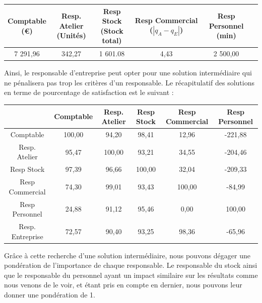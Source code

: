 \documentclass[paper=a4, fontsize=11pt]{report}
\numberwithin{equation}{section}		%
\numberwithin{figure}{section}			%
\numberwithin{table}{section}				%
\newcommand\abs[1]{\left|#1\right|}
\begin{document}
\begin{table}[H]
\begin{center}
\begin{tabular}{c|ccccc}
\shortstack{Comptable \\ \scriptsize{(€)}} & \shortstack{Resp. Atelier \\ \scriptsize (Unités)} & \shortstack{Resp Stock \\ \scriptsize (Stock total)} & \shortstack{Resp Commercial \\ \scriptsize ($\abs{q_A - q_E}$)} &   \shortstack{Resp Personnel \\ \scriptsize (min)} \\ 
\hline 
7 291,96 & 342,27 & 1 601.08 & 4,43 & 2 500,00 \\ 
\end{tabular}
\end{center}
\end{table}

Ainsi, le responsable d'entreprise peut opter pour une solution intermédiaire qui ne pénalisera pas trop les critères d'un responsable. Le récapitulatif des solutions en terme de pourcentage de satisfaction est le suivant :

\begin{table}[H]
\begin{center}
\begin{tabular}{c|ccccc}
 & Comptable & Resp. Atelier & Resp Stock & Resp Commercial &  Resp Personnel\\ 
\hline 
Comptable &  \cellcolor{black!5} 100,00 & 94,20 & 98,41 & 12,96 & -221,88 \\ 
Resp. Atelier & 95,47 & \cellcolor{black!5}100,00 & 93,21 & 34,55 & -204,46 \\ 
Resp Stock & 97,39 & 96,66 & \cellcolor{black!5}100,00 & 32,04 & -209,33 \\ 
Resp Commercial & 74,30 & 99,01 & 93,43 & \cellcolor{black!5}100,00 & -84,99 \\ 
Resp Personnel & 24,88 & 91,12 & 95,46 & 0,00 & \cellcolor{black!5}100,00 \\ 
Resp. Entreprise & 72,57 & 90,40 & 93,25 & 98,36 & -65,96 \\
\end{tabular}
\end{center}
\end{table}

Grâce à cette recherche d'une solution intermédiaire, nous pouvons dégager une pondération de l'importance de chaque responsable. Le responsable du stock ainsi que le responsable du personnel ayant un impact similaire sur les résultats comme nous venons de le voir, et étant pris en compte en dernier, nous pouvons leur donner une pondération de 1.\\
\end{document}

